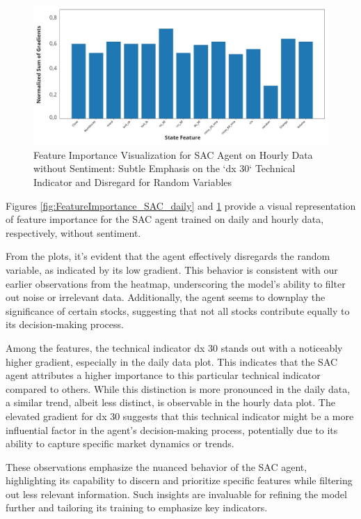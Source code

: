 \documentclass[12pt]{article}
\begin{document}
\begin{figure}[h]
\centering
\includegraphics[width=1\textwidth]{figs/FeatureImportance_SAC_hourly.jpg}
\caption{Feature Importance Visualization for SAC Agent on Hourly Data without Sentiment: Subtle Emphasis on the `dx 30` Technical Indicator and Disregard for Random Variables}
\label{fig:FeatureImportance_SAC_hourly}
\end{figure}

Figures \ref{fig:FeatureImportance_SAC_daily} and \ref{fig:FeatureImportance_SAC_hourly} provide a visual representation of feature importance for the SAC agent trained on daily and hourly data, respectively, without sentiment.

From the plots, it's evident that the agent effectively disregards the random variable, as indicated by its low gradient. This behavior is consistent with our earlier observations from the heatmap, underscoring the model's ability to filter out noise or irrelevant data. Additionally, the agent seems to downplay the significance of certain stocks, suggesting that not all stocks contribute equally to its decision-making process.

Among the features, the technical indicator dx 30 stands out with a noticeably higher gradient, especially in the daily data plot. This indicates that the SAC agent attributes a higher importance to this particular technical indicator compared to others. While this distinction is more pronounced in the daily data, a similar trend, albeit less distinct, is observable in the hourly data plot. The elevated gradient for dx 30 suggests that this technical indicator might be a more influential factor in the agent's decision-making process, potentially due to its ability to capture specific market dynamics or trends.

These observations emphasize the nuanced behavior of the SAC agent, highlighting its capability to discern and prioritize specific features while filtering out less relevant information. Such insights are invaluable for refining the model further and tailoring its training to emphasize key indicators.
\end{document}
